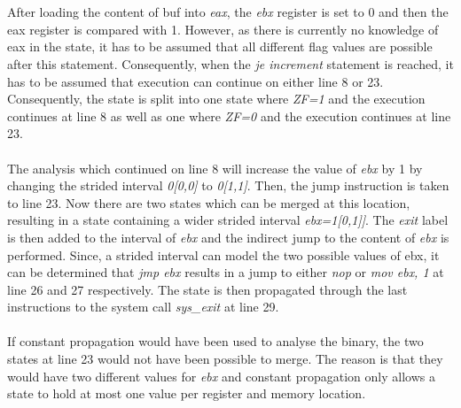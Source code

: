 \documentclass{kththesis}
\renewcommand{\it}[1]{\textit{#1}}
\begin{document}
\\ \\
After loading the content of buf into \it{eax}, the \it{ebx} register is set to 0 and then the eax register is compared with 1. However, as there is currently no knowledge of eax in the state, it has to be assumed that all different flag values are possible after this statement. Consequently, when the \it{je increment} statement is reached, it has to be assumed that execution can continue on either line 8 or 23. Consequently, the state is split into one state where \it{ZF=1} and the execution continues at line 8 as well as one where \it{ZF=0} and the execution continues at line 23. 
\\ \\
The analysis which continued on line 8 will increase the value of \it{ebx} by 1 by changing the strided interval \it{0[0,0]} to \it{0[1,1]}. Then, the jump instruction is taken to line 23. Now there are two states which can be merged at this location, resulting in a state containing a wider strided interval \it{ebx=1[0,1]]}. The \it{exit} label is then added to the interval of \it{ebx} and the indirect jump to the content of \it{ebx} is performed. Since, a strided interval can model the two possible values of ebx, it can be determined that \it{jmp ebx} results in a jump to either \it{nop} or \it{mov ebx, 1} at line 26 and 27 respectively. The state is then propagated through the last instructions to the system call \it{sys\_exit} at line 29.
\\ \\
If constant propagation would have been used to analyse the binary, the two states at line 23 would not have been possible to merge. The reason is that they would have two different values for \it{ebx} and constant propagation only allows a state to hold at most one value per register and memory location.
\end{document}
